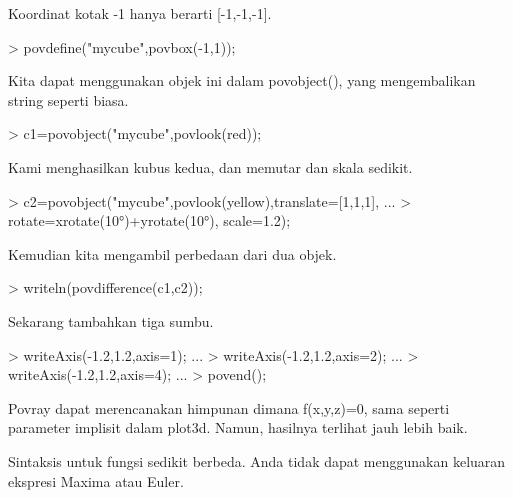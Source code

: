 \documentclass[a4paper,10pt]{article}
\begin{document}
\begin{eulernotebook}
\begin{eulercomment}
\begin{eulercomment}
\begin{eulercomment}
Koordinat kotak -1 hanya berarti [-1,-1,-1].
\end{eulercomment}
\begin{eulerprompt}
> povdefine("mycube",povbox(-1,1));
\end{eulerprompt}
\begin{eulercomment}
Kita dapat menggunakan objek ini dalam povobject(), yang mengembalikan
string seperti biasa.
\end{eulercomment}
\begin{eulerprompt}
> c1=povobject("mycube",povlook(red));
\end{eulerprompt}
\begin{eulercomment}
Kami menghasilkan kubus kedua, dan memutar dan skala sedikit.
\end{eulercomment}
\begin{eulerprompt}
> c2=povobject("mycube",povlook(yellow),translate=[1,1,1], ...
>  rotate=xrotate(10°)+yrotate(10°), scale=1.2);
\end{eulerprompt}
\begin{eulercomment}
Kemudian kita mengambil perbedaan dari dua objek.
\end{eulercomment}
\begin{eulerprompt}
> writeln(povdifference(c1,c2));
\end{eulerprompt}
\begin{eulercomment}
Sekarang tambahkan tiga sumbu.
\end{eulercomment}
\begin{eulerprompt}
> writeAxis(-1.2,1.2,axis=1); ...
> writeAxis(-1.2,1.2,axis=2); ...
> writeAxis(-1.2,1.2,axis=4); ...
> povend();
\end{eulerprompt}
\begin{eulercomment}
Povray dapat merencanakan himpunan dimana f(x,y,z)=0, sama seperti
parameter implisit dalam plot3d. Namun, hasilnya terlihat jauh lebih
baik.

Sintaksis untuk fungsi sedikit berbeda. Anda tidak dapat menggunakan
keluaran ekspresi Maxima atau Euler.


\end{eulercomment}
\end{eulercomment}
\end{eulercomment}
\end{eulernotebook}
\end{document}
